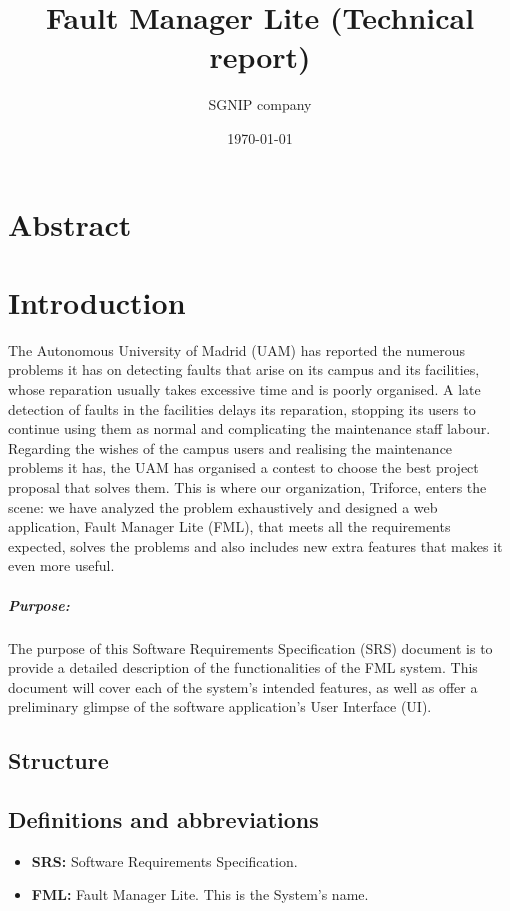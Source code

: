 \documentclass{report}
\title{Fault Manager Lite (Technical report)}
\date{\today}
\author{SGNIP company}
\begin{document}
\maketitle
\tableofcontents
\newpage
\chapter{Abstract}

\chapter{Introduction}

The Autonomous University of Madrid (UAM) has reported the numerous problems it has on detecting faults that arise on its campus and its facilities, whose reparation usually takes excessive time and is poorly organised. A late detection of faults in the facilities delays its reparation, stopping its users to continue using them as normal and complicating the maintenance staff labour. Regarding the wishes of the campus users and realising the maintenance problems it has, the UAM has organised a contest to choose the best project proposal that solves them.
This is where our organization, Triforce, enters the scene: we have analyzed the problem exhaustively and designed a web application, Fault Manager Lite (FML), that meets all the requirements expected, solves the problems and also includes new extra features that makes it even more useful.

\paragraph{Purpose: }
The purpose of this Software Requirements Specification (SRS) document is to provide a
detailed description of the functionalities of the FML system. This document will cover each of the system's intended features, as well as offer a preliminary glimpse of the software application's User Interface (UI).

\section{Structure}

\section{Definitions and abbreviations}

\begin{itemize}
\item \textbf{SRS: } Software Requirements Specification.

\item \textbf{FML: } Fault Manager Lite. This is the System's name.

\end{itemize}
\end{document}
